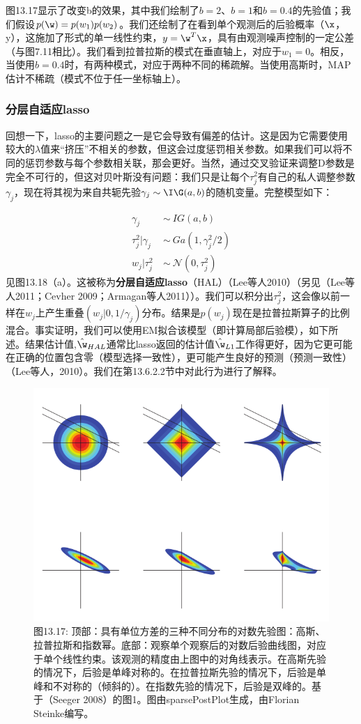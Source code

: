 \documentclass[a4paper]{article}
\begin{document}
图13.17显示了改变b的效果，其中我们绘制了$b=2$、$b=1$和$b=0.4$的先验值；我们假设$p(\w)=p(w_1)p(w_2)$。我们还绘制了在看到单个观测后的后验概率（$\x$，y），这施加了形式的单一线性约束，$y=\w^T\x$，具有由观测噪声控制的一定公差（与图7.11相比）。我们看到拉普拉斯的模式在垂直轴上，对应于$w_1=0$。相反，当使用$b=0.4$时，有两种模式，对应于两种不同的稀疏解。当使用高斯时，MAP估计不稀疏（模式不位于任一坐标轴上）。

\subsubsection{分层自适应lasso}
回想一下，lasso的主要问题之一是它会导致有偏差的估计。这是因为它需要使用较大的$\lambda$值来“挤压”不相关的参数，但这会过度惩罚相关参数。如果我们可以将不同的惩罚参数与每个参数相关联，那会更好。当然，通过交叉验证来调整D参数是完全不可行的，但这对贝叶斯没有问题：我们只是让每个$\tau_j^2$有自己的私人调整参数$\gamma_j$，现在将其视为来自共轭先验$\gamma_j\sim \I\G(a,b)$的随机变量。完整模型如下：

\begin{align}
	\gamma_j\ &\sim\ IG(a,b)\tag{13.133}\\
	\tau_j^2|\gamma_j\ &\sim\ Ga(1,\gamma_j^2/2)\tag{13.134}\\
	w_j|\tau_j^2\ &\sim\ \mathcal{N}(0,\tau_j^2)\tag{13.135}
\end{align}
见图13.18（a）。这被称为\textbf{分层自适应lasso}（HAL）（Lee等人2010）（另见（Lee等人2011；Cevher 2009；Armagan等人2011））。我们可以积分出$\tau_j^2$，这会像以前一样在$w_j$上产生重叠$(w_j|0,1/\gamma_j)$分布。结果是$p(w_j)$现在是拉普拉斯算子的比例混合。事实证明，我们可以使用EM拟合该模型（即计算局部后验模），如下所述。结果估计值,$\hat{\w}_{HAL}$通常比lasso返回的估计值$\hat{\w}_{L1}$工作得更好，因为它更可能在正确的位置包含零（模型选择一致性），更可能产生良好的预测（预测一致性）（Lee等人，2010）。我们在第13.6.2.2节中对此行为进行了解释。

\begin{figure}[h]
	\centering
	\includegraphics[width=0.7\linewidth]{fig13/figure17}
	\caption*{图13.17: 顶部：具有单位方差的三种不同分布的对数先验图：高斯、拉普拉斯和指数幂。底部：观察单个观察后的对数后验曲线图，对应于单个线性约束。该观测的精度由上图中的对角线表示。在高斯先验的情况下，后验是单峰对称的。在拉普拉斯先验的情况下，后验是单峰和不对称的（倾斜的）。在指数先验的情况下，后验是双峰的。基于（Seeger 2008）的图1。图由sparsePostPlot生成，由Florian Steinke编写。}
\end{figure}
\end{document}
